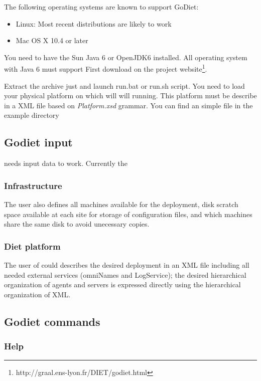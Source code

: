 The following operating systems are known to support GoDiet:
\begin{itemize}
    \item Linux: Most recent distributions are likely to work
    \item Mac OS X 10.4 or later
\end{itemize}

You need to have the Sun Java 6 or OpenJDK6 installed. All operating system with Java 6 must support 
First download \godiet on the project website\footnote{http://graal.ens-lyon.fr/DIET/godiet.html}.

 Extract the archive just and launch run.bat or run.sh script.
You need to load your physical platform on which will \godiet will
running. This platform must be describe in a XML file based on
\textit{Platform.xsd} grammar. You can find an simple file in the example directory 

\subsection{Godiet input}

\godiet needs input data to work.  Currently the 
\subsubsection{Infrastructure}
\label{GODIETInfrastructureDesc}
The user also defines all machines available for the deployment, disk scratch
space available at each site for storage of configuration files, and which
machines share the same disk to avoid unecessary copies. 

\subsubsection{Diet platform}
\label{GODIETPlatformDesc}
The user of \godiet could describes the desired
deployment in an XML file including all needed external services (\eg omniNames
and LogService); the desired hierarchical organization of agents and servers is
expressed directly using the hierarchical organization of XML. 

\subsection{Godiet commands}

\subsubsection{Help}

